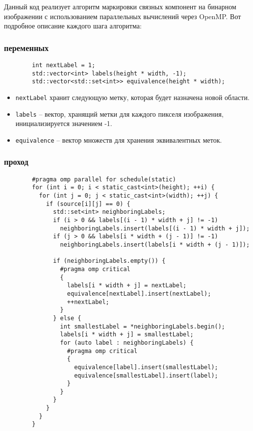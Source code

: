 \documentclass[a4paper, 14pt]{article}
\begin{document}
        Данный код реализует алгоритм маркировки связных компонент на бинарном изображении с использованием параллельных вычислений через OpenMP. Вот подробное описание каждого шага алгоритма:
        
        \subsubsection*{ переменных}
        
        \begin{verbatim}
        int nextLabel = 1;
        std::vector<int> labels(height * width, -1);
        std::vector<std::set<int>> equivalence(height * width);
        \end{verbatim}
        
        \begin{itemize}
          \item \texttt{nextLabel} хранит следующую метку, которая будет назначена новой области.
          \item \texttt{labels} – вектор, хранящий метки для каждого пикселя изображения, инициализируется значением -1.
          \item \texttt{equivalence} – вектор множеств для хранения эквивалентных меток.
        \end{itemize}
        
        \subsubsection*{ проход}
        
        \begin{verbatim}
        #pragma omp parallel for schedule(static)
        for (int i = 0; i < static_cast<int>(height); ++i) {
          for (int j = 0; j < static_cast<int>(width); ++j) {
            if (source[i][j] == 0) {
              std::set<int> neighboringLabels;
              if (i > 0 && labels[(i - 1) * width + j] != -1)
                neighboringLabels.insert(labels[(i - 1) * width + j]);
              if (j > 0 && labels[i * width + (j - 1)] != -1)
                neighboringLabels.insert(labels[i * width + (j - 1)]);
        
              if (neighboringLabels.empty()) {
                #pragma omp critical
                {
                  labels[i * width + j] = nextLabel;
                  equivalence[nextLabel].insert(nextLabel);
                  ++nextLabel;
                }
              } else {
                int smallestLabel = *neighboringLabels.begin();
                labels[i * width + j] = smallestLabel;
                for (auto label : neighboringLabels) {
                  #pragma omp critical
                  {
                    equivalence[label].insert(smallestLabel);
                    equivalence[smallestLabel].insert(label);
                  }
                }
              }
            }
          }
        }
        \end{verbatim}
        
\end{document}
